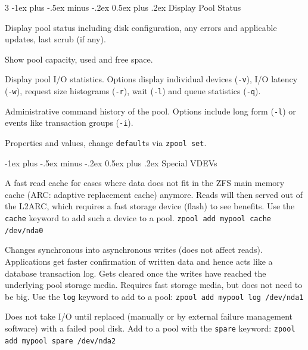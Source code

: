 \documentclass[10pt,landscape,letter]{article}
\makeatletter
\renewcommand{\section}{\@startsection{section}{1}{0mm}%
                                {-1ex plus -.5ex minus -.2ex}%
                                {0.5ex plus .2ex}%
                                {\normalfont\large\bfseries}}
\makeatother
\begin{document}
\begin{multicols}{3}
	\section{Display Pool Status}
	\begin{Description}
    \item[\texttt{zpool status}] Display pool status including disk
      configuration, any errors and applicable updates, last scrub (if any).
		\item[\texttt{zpool list}] Show pool capacity, used and free space.
    \item[\texttt{zpool iostat}] Display pool I/O statistics. Options
      display individual devices (\texttt{-v}), I/O latency (\texttt{-w}),
      request size histograms (\texttt{-r}), wait (\texttt{-l}) and queue
      statistics (\texttt{-q}).
    \item[\texttt{zpool history}] Administrative command history of the pool.
      Options include long form (\texttt{-l}) or events like transaction groups
      (\texttt{-i}).
    \item[\texttt{zpool get}] Properties and values, change \texttt{default}s
      via \texttt{zpool set}.
	\end{Description}

  \section{Special VDEVs}
	\begin{Description}
    \item[Level 2 ARC (L2ARC)] A fast read cache for cases where data does not
      fit in the ZFS main memory cache (ARC: adaptive replacement cache)
      anymore. Reads will then served out of the L2ARC, which requires a fast
      storage device (flash) to see benefits. Use the \texttt{cache} keyword to
      add such a device to a pool. \texttt{zpool add mypool cache /dev/nda0}
    \item[ZFS Intent Log (ZIL)] Changes synchronous into asynchronous writes
      (does not affect reads). Applications get faster confirmation of written
      data and hence acts like a database transaction log. Gets cleared once
      the writes have reached the underlying pool storage media. Requires fast
      storage media, but does not need to be big. Use the \texttt{log} keyword
      to add to a pool: \texttt{zpool add mypool log /dev/nda1}
    \item[Spare] Does not take I/O until replaced (manually or by external
      failure management software) with a failed pool disk. Add to a pool with
      the \texttt{spare} keyword: \texttt{zpool add mypool spare /dev/nda2}
  \end{Description}


\end{multicols}
\end{document}
